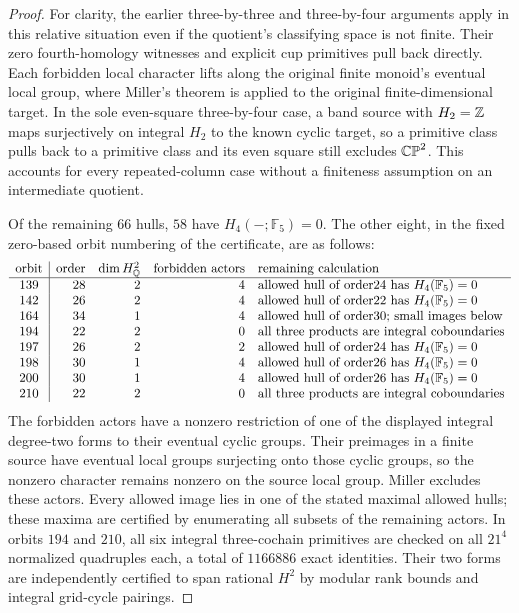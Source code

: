 \begin{proof}
For clarity, the earlier three-by-three and three-by-four arguments
apply in this relative situation even if the quotient's classifying
space is not finite.  Their zero fourth-homology witnesses and explicit
cup primitives pull back directly.  Each forbidden local character
lifts along the original finite monoid's eventual local group, where
Miller's theorem is applied to the original finite-dimensional target.
In the sole even-square three-by-four case, a band source with
$H_2=\mathbb Z$ maps surjectively on integral $H_2$ to the known cyclic
target, so a primitive class pulls back to a primitive class and its
even square still excludes $\mathbb {CP}^2$.
This accounts for every repeated-column case without a finiteness
assumption on an intermediate quotient.

Of the remaining $66$ hulls, $58$ have $H_4(-;\mathbb F_5)=0$.
The other eight, in the fixed zero-based orbit numbering of the
certificate, are as follows:
\[
\begin{array}{c|rrrl}
\text{orbit}&\text{order}&\dim H^2_{\mathbb Q}&
 \text{forbidden actors}&\text{remaining calculation}\\\hline
139&28&2&4&\text{allowed hull of order24 has }H_4(\mathbb F_5)=0\\
142&26&2&4&\text{allowed hull of order22 has }H_4(\mathbb F_5)=0\\
164&34&1&4&\text{allowed hull of order30; small images below}\\
194&22&2&0&\text{all three products are integral coboundaries}\\
197&26&2&2&\text{allowed hull of order24 has }H_4(\mathbb F_5)=0\\
198&30&1&4&\text{allowed hull of order26 has }H_4(\mathbb F_5)=0\\
200&30&1&4&\text{allowed hull of order26 has }H_4(\mathbb F_5)=0\\
210&22&2&0&\text{all three products are integral coboundaries}
\end{array}
\]
The forbidden actors have a nonzero restriction of one of the displayed
integral degree-two forms to their eventual cyclic groups.  Their
preimages in a finite source have eventual local groups surjecting onto
those cyclic groups, so the nonzero character remains nonzero on the
source local group.  Miller excludes these actors.  Every allowed
image lies in one of the stated maximal allowed hulls; these maxima
are certified by enumerating all subsets of the remaining actors.
In orbits $194$ and $210$, all six integral three-cochain primitives
are checked on all $21^4$ normalized quadruples each, a total of
$1166886$ exact identities.  Their two forms are independently
certified to span rational $H^2$ by modular rank bounds and integral
grid-cycle pairings.


\end{proof}
